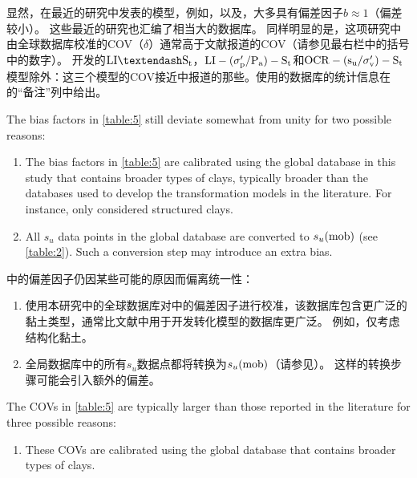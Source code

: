 \begin{paracol}{2}
    \switchcolumn
    
    显然，在最近的研究中发表的模型，例如\citet{Kulhawy1990}，\citet{Chen1996488}以及\citet{Ching201252, Ching2012522}，大多具有偏差因子$b\approx{}1$（偏差较小）。 这些最近的研究也汇编了相当大的数据库。 同样明显的是，这项研究中由全球数据库校准的COV（$\delta$）通常高于文献报道的COV（请参见最右栏中的括号中的数字）。 \citet{Ching2012522}开发的$\rm{LI}–S_t$，$\rm{LI}-(\sigma_p'/P_a)-S_t$和$\rm{OCR}-(s_u/\sigma_v')-S_t$模型除外：这三个模型的COV接近\citet{Ching2012522}中报道的那些。\citet{Ching2012522}使用的数据库的统计信息在的“备注”列中给出。
    
    
    \switchcolumn*
    
    The bias factors in \autoref{table:5} still deviate somewhat from unity for two possible reasons:
    \begin{enumerate}
        \item The bias factors in \autoref{table:5} are calibrated using the global database in this study that contains broader types of clays, typically broader than the databases used to develop the transformation models in the literature. For instance, \citet{Ching2012522} only considered structured clays.
        
        \item All $s_u$ data points in the global database are converted to $s_u(\rm{mob})$ (see \autoref{table:2}). Such a conversion step may introduce an extra bias.
    \end{enumerate}
    
    \switchcolumn
    
    中的偏差因子仍因某些可能的原因而偏离统一性：
    \begin{enumerate}
        \item 使用本研究中的全球数据库对中的偏差因子进行校准，该数据库包含更广泛的黏土类型，通常比文献中用于开发转化模型的数据库更广泛。 例如，\citet{Ching2012522}仅考虑结构化黏土。
        
        \item 全局数据库中的所有$s_u$数据点都将转换为$s_u(\rm{mob})$（请参见）。 这样的转换步骤可能会引入额外的偏差。
    \end{enumerate}
    
    \switchcolumn*
    
    The COVs in \autoref{table:5} are typically larger than those reported in the literature for three possible reasons:
    \begin{enumerate}
        \item These COVs are calibrated using the global database that contains broader types of clays.
        

\end{enumerate}
\end{paracol}
